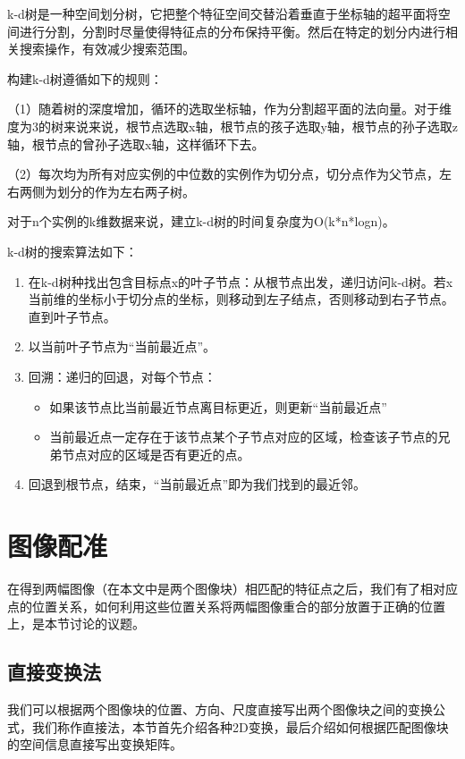 k-d树是一种空间划分树，它把整个特征空间交替沿着垂直于坐标轴的超平面将空间进行分割，分割时尽量使得特征点的分布保持平衡。然后在特定的划分内进行相关搜索操作，有效减少搜索范围。

构建k-d树遵循如下的规则：

（1）随着树的深度增加，循环的选取坐标轴，作为分割超平面的法向量。对于维度为3的树来说来说，根节点选取x轴，根节点的孩子选取y轴，根节点的孙子选取z轴，根节点的曾孙子选取x轴，这样循环下去。

（2）每次均为所有对应实例的中位数的实例作为切分点，切分点作为父节点，左右两侧为划分的作为左右两子树。

对于n个实例的k维数据来说，建立k-d树的时间复杂度为O(k*n*logn)。

k-d树的搜索算法如下\cite{李航2012统计学习方法}：
\begin{enumerate}
\item 在k-d树种找出包含目标点x的叶子节点：从根节点出发，递归访问k-d树。若x当前维的坐标小于切分点的坐标，则移动到左子结点，否则移动到右子节点。直到叶子节点。
\item 以当前叶子节点为“当前最近点”。
\item 回溯：递归的回退，对每个节点：

	\begin{itemize}
	\item 如果该节点比当前最近节点离目标更近，则更新“当前最近点”
	\item 当前最近点一定存在于该节点某个子节点对应的区域，检查该子节点的兄弟节点对应的区域是否有更近的点。
	\end{itemize}

\item 回退到根节点，结束，“当前最近点”即为我们找到的最近邻。
\end{enumerate}
\section{图像配准}

在得到两幅图像（在本文中是两个图像块）相匹配的特征点之后，我们有了相对应点的位置关系，如何利用这些位置关系将两幅图像重合的部分放置于正确的位置上，是本节讨论的议题。

\subsection{直接变换法}
我们可以根据两个图像块的位置、方向、尺度直接写出两个图像块之间的变换公式，我们称作直接法，本节首先介绍各种2D变换，最后介绍如何根据匹配图像块的空间信息直接写出变换矩阵。

